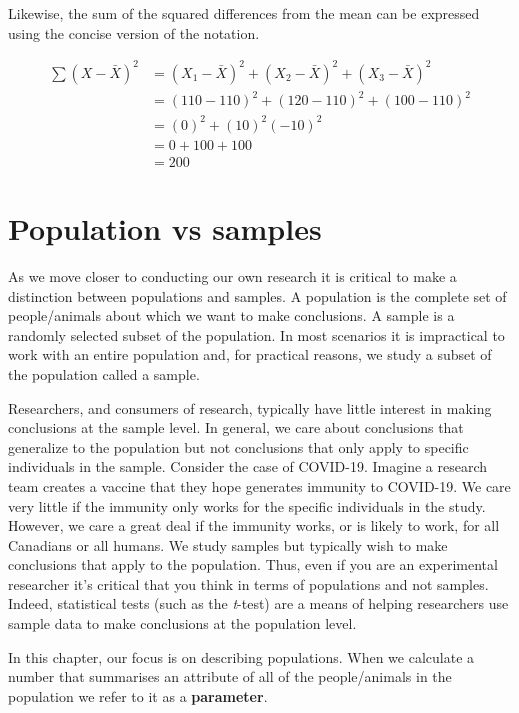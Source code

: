 \documentclass[
]{krantz}
\begin{document}
Likewise, the sum of the squared differences from the mean can be expressed using the concise version of the notation.

\[
\begin{aligned} 
\sum{(X - \bar{X})^2} &= (X_1-\bar{X})^2 + (X_2-\bar{X})^2 + (X_3-\bar{X})^2\\ 
&= (110-110)^2 + (120-110)^2 + (100-110)^2\\
&= (0)^2 + (10)^2 (-10)^2 \\
&= 0 + 100 + 100 \\
&= 200
\end{aligned} 
\]

\hypertarget{population-vs-samples}{%
\section{Population vs samples}\label{population-vs-samples}}

As we move closer to conducting our own research it is critical to make a distinction between populations and samples. A population is the complete set of people/animals about which we want to make conclusions. A sample is a randomly selected subset of the population. In most scenarios it is impractical to work with an entire population and, for practical reasons, we study a subset of the population called a sample.

Researchers, and consumers of research, typically have little interest in making conclusions at the sample level. In general, we care about conclusions that generalize to the population but not conclusions that only apply to specific individuals in the sample. Consider the case of COVID-19. Imagine a research team creates a vaccine that they hope generates immunity to COVID-19. We care very little if the immunity only works for the specific individuals in the study. However, we care a great deal if the immunity works, or is likely to work, for all Canadians or all humans. We study samples but typically wish to make conclusions that apply to the population. Thus, even if you are an experimental researcher it's critical that you think in terms of populations and not samples. Indeed, statistical tests (such as the \emph{t}-test) are a means of helping researchers use sample data to make conclusions at the population level.

In this chapter, our focus is on describing populations. When we calculate a number that summarises an attribute of all of the people/animals in the population we refer to it as a \textbf{parameter}.
\end{document}
